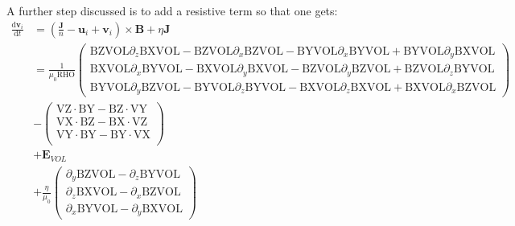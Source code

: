 \documentclass[a4paper,10pt]{article}
\newcommand{\vv}[1]{\mathbf{#1}}
\newcommand{\dif}{\mathrm{d}}
\newcommand{\pp}[1]{\left(#1\right)}
\begin{document}
A further step discussed is to add a resistive term so that one gets:
\begin{align}
   \frac{\dif\vv{v}_i}{\dif t} &= \pp{\frac{\vv{J}}{n} - \vv{u}_i + \vv{v}_i}\times\vv{B} + \eta\vv{J} \\
   &= \frac{1}{\mu_0 \textrm{RHO}}
   \begin{pmatrix}
      \textrm{BZVOL}\partial_z\textrm{BXVOL} - \textrm{BZVOL}\partial_x\textrm{BZVOL} - \textrm{BYVOL}\partial_x\textrm{BYVOL} + \textrm{BYVOL}\partial_y\textrm{BXVOL} \\
      \textrm{BXVOL}\partial_x\textrm{BYVOL} - \textrm{BXVOL}\partial_y\textrm{BXVOL} - \textrm{BZVOL}\partial_y\textrm{BZVOL} + \textrm{BZVOL}\partial_z\textrm{BYVOL} \\
      \textrm{BYVOL}\partial_y\textrm{BZVOL} - \textrm{BYVOL}\partial_z\textrm{BYVOL} - \textrm{BXVOL}\partial_z\textrm{BXVOL} + \textrm{BXVOL}\partial_x\textrm{BZVOL}
   \end{pmatrix} \\
   &-
   \begin{pmatrix}
      \textrm{VZ}\cdot\textrm{BY} - \textrm{BZ}\cdot\textrm{VY} \\
      \textrm{VX}\cdot\textrm{BZ} - \textrm{BX}\cdot\textrm{VZ} \\
      \textrm{VY}\cdot\textrm{BY} - \textrm{BY}\cdot\textrm{VX} \\
   \end{pmatrix} \\
   &+ \vv{E}_{VOL} \\
   &+\frac{\eta}{\mu_0}
   \begin{pmatrix}
      \partial_y\textrm{BZVOL} - \partial_z\textrm{BYVOL} \\
      \partial_z\textrm{BXVOL} - \partial_x\textrm{BZVOL} \\
      \partial_x\textrm{BYVOL} - \partial_y\textrm{BXVOL}
   \end{pmatrix}
\end{align}
\end{document}

